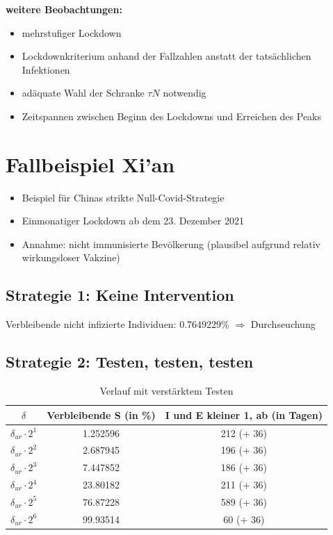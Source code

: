 \documentclass{scrartcl}
\begin{document}
\textbf{weitere Beobachtungen: }
\begin{itemize}
\item mehrstufiger Lockdown
\item Lockdownkriterium anhand der Fallzahlen anstatt der tatsächlichen Infektionen
\item adäquate Wahl der Schranke $\tau N$ notwendig
\item Zeitspannen zwischen Beginn des Lockdowns und Erreichen des Peaks
\end{itemize}


%
%

\section{Fallbeispiel Xi'an}
	\begin{itemize}
		\item Beispiel für Chinas strikte Null-Covid-Strategie
		\item Einmonatiger Lockdown ab dem 23. Dezember 2021
		\item Annahme: nicht immunisierte Bevölkerung (plausibel aufgrund relativ wirkungsloser Vakzine)
	\end{itemize}

\subsection{Strategie 1: Keine Intervention}
	Verbleibende nicht infizierte Individuen: 0.7649229\% $\Rightarrow$ Durchseuchung


\subsection{Strategie 2: Testen, testen, testen}
	\begin{table}[h]
		\caption{Verlauf mit verstärktem Testen}
		\centering
		\begin{tabular}{@{}ccc@{}}
			\toprule
			$\delta$ & Verbleibende S (in \%) & I und E kleiner 1, ab (in Tagen)\\ 
			\midrule
			 $\delta_{ur} \cdot 2^1$ & 1.252596 & 212 (+ 36) \\ 
			 $\delta_{ur} \cdot 2^2$ & 2.687945 & 196 (+ 36)\\  
			 $\delta_{ur} \cdot 2^3$ & 7.447852 & 186 (+ 36)\\ 
			 $\delta_{ur} \cdot 2^4$ & 23.80182 & 211 (+ 36)\\ 
			 $\delta_{ur} \cdot 2^5$ & 76.87228 & 589 (+ 36)\\ 
			 $\delta_{ur} \cdot 2^6$ & 99.93514 & 60 (+ 36)\\ 
			\bottomrule
		\end{tabular}
	\end{table}
	
\end{document}
